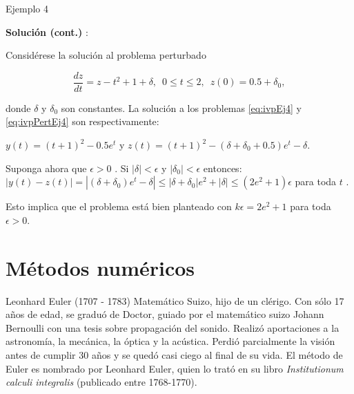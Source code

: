 \documentclass{beamer}
\begin{document}
\begin{frame}{Ejemplo 4}

	\textbf{Soluci\'on (cont.)} :
	
	Considérese la solución al problema perturbado
	
\begin{equation}\label{eq:ivpPertEj4}
\dfrac{d z}{d t} = z - t^2 + 1 + \delta, \,\,\, 0 \leq t \leq 2, \,\,\, z(0) = 0.5 + \delta_0,
\end{equation}

donde $\delta$ y $\delta_0$ son constantes. La solución a los problemas \eqref{eq:ivpEj4} y \eqref{eq:ivpPertEj4} son respectivamente:


$y(t) = (t+1)^2 - 0.5 e^t $ y $ z(t) = (t+1)^2 - (\delta + \delta_0 + 0.5) e^t - \delta $. 

\strut
\pause

Suponga ahora que $\epsilon > 0$ . Si $|\delta| < \epsilon$ y $|\delta_0| < \epsilon$ entonces:
$|y(t) - z(t)| = |(\delta + \delta_0) e^t - \delta| \leq |\delta + \delta_0| e^2 + |\delta| \leq (2 e^2 + 1) \epsilon$ para toda $t$ . 

\pause

Esto implica que el problema está bien planteado  con $k \epsilon = 2e^2 + 1$ para toda $\epsilon > 0$. 

\end{frame}

\section{Métodos numéricos}

\begin{frame}{Leonhard Euler (1707 - 1783)}
	 Matemático Suizo, hijo de un clérigo. Con sólo 17 años de edad, se graduó de Doctor, guiado por el matemático suizo Johann Bernoulli con una tesis sobre propagación del sonido. \pause Realizó aportaciones a la astronomía, la mecánica, la óptica y la acústica. Perdió parcialmente la visión antes de cumplir 30 años y se quedó casi ciego al final de su vida. \pause El método de Euler es nombrado por Leonhard Euler, quien lo trató en su libro \textit{Institutionum calculi integralis} (publicado entre 1768-1770).
\end{frame}
\end{document}
